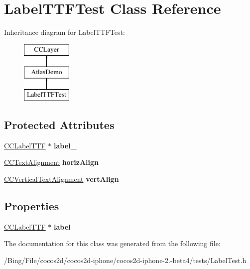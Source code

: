 \hypertarget{interface_label_t_t_f_test}{\section{Label\-T\-T\-F\-Test Class Reference}
\label{interface_label_t_t_f_test}
}
Inheritance diagram for Label\-T\-T\-F\-Test\-:\begin{figure}[H]
\begin{center}
\leavevmode
\includegraphics[height=3.000000cm]{interface_label_t_t_f_test}
\end{center}
\end{figure}
\subsection*{Protected Attributes}
\begin{DoxyCompactItemize}
\item 
\hypertarget{interface_label_t_t_f_test_a8aaa4f0b0ab0236d8c316d520aaf7722}{\hyperlink{class_c_c_label_t_t_f}{C\-C\-Label\-T\-T\-F} $\ast$ {\bfseries label\-\_\-}}\label{interface_label_t_t_f_test_a8aaa4f0b0ab0236d8c316d520aaf7722}

\item 
\hypertarget{interface_label_t_t_f_test_af5a7ce649440422a4b09f088c0f522c3}{\hyperlink{cc_types_8h_aa56b958f0cc9bdec20a15ed6bea3d0f1}{C\-C\-Text\-Alignment} {\bfseries horiz\-Align}}\label{interface_label_t_t_f_test_af5a7ce649440422a4b09f088c0f522c3}

\item 
\hypertarget{interface_label_t_t_f_test_af45cbb1e625125ede5ae1ecf8305461a}{\hyperlink{cc_types_8h_a7ec81bc3a093bf8c36b996174d97dda3}{C\-C\-Vertical\-Text\-Alignment} {\bfseries vert\-Align}}\label{interface_label_t_t_f_test_af45cbb1e625125ede5ae1ecf8305461a}

\end{DoxyCompactItemize}
\subsection*{Properties}
\begin{DoxyCompactItemize}
\item 
\hypertarget{interface_label_t_t_f_test_a3961a72d2a9c628eef77fc0cd26626e8}{\hyperlink{class_c_c_label_t_t_f}{C\-C\-Label\-T\-T\-F} $\ast$ {\bfseries label}}\label{interface_label_t_t_f_test_a3961a72d2a9c628eef77fc0cd26626e8}

\end{DoxyCompactItemize}


The documentation for this class was generated from the following file\-:\begin{DoxyCompactItemize}
\item 
/\-Bing/\-File/cocos2d/cocos2d-\/iphone/cocos2d-\/iphone-\/2.-\/beta4/tests/Label\-Test.\-h\end{DoxyCompactItemize}
